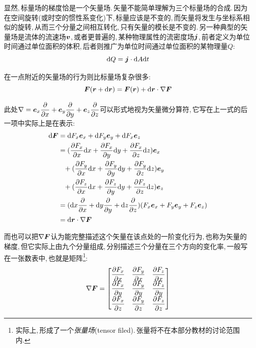 显然,\,标量场的梯度恰是一个矢量场.\,矢量不能简单理解为三个标量场的合成.\,因为在空间旋转(或时空的惯性系变化)下,\,标量应该是不变的,\,而矢量将发生与坐标系相似的旋转,\,从而三个分量之间相互转化,\,只有矢量的模长是不变的.\,另一种典型的矢量场是流体的流速场\(\boldsymbol{v}\),\,或者更普遍的,\,某种物理属性的流密度场\(\boldsymbol{j}\),\,前者定义为单位时间通过单位面积的体积,\,后者则推广为单位时间通过单位面积的某物理量\(Q\):
\[\textrm{d} Q=\boldsymbol{j}\cdot\textrm{d} A\textrm{d} t\]

在一点附近的矢量场的行为则比标量场复杂很多:
\[\boldsymbol{F}(\boldsymbol{r}+\textrm{d}\boldsymbol{r})=\boldsymbol{F}(\boldsymbol{r})+\textrm{d} \boldsymbol{r}\cdot\nabla \boldsymbol{F}\]

此处\(\nabla=\boldsymbol{e}_x\dfrac{\partial}{\partial x}+\boldsymbol{e}_y\dfrac{\partial}{\partial y}+\boldsymbol{e}_z\dfrac{\partial}{\partial z}\)可以形式地视为矢量微分算符,\,它写在上一式的后一项中实际上是在表示:
\begin{align*}
\textrm{d} \boldsymbol{F} 	&=\textrm{d} F_x \boldsymbol{e}_x+\textrm{d} F_y \boldsymbol{e}_y+\textrm{d} F_x \boldsymbol{e}_z \\
			&=(\frac{\partial F_x}{\partial x}\textrm{d} x+\frac{\partial F_x}{\partial y}\textrm{d} y+\frac{\partial F_x}{\partial z}\textrm{d} z)\boldsymbol{e}_x\\
			&\phantom{=}+(\frac{\partial F_y}{\partial x}\textrm{d} x+\frac{\partial F_y}{\partial y}\textrm{d} y+\frac{\partial F_y}{\partial z}\textrm{d} z)\boldsymbol{e}_y\\
			&\phantom{=}+(\frac{\partial F_z}{\partial x}\textrm{d} x+\frac{\partial F_z}{\partial y}\textrm{d} y+\frac{\partial F_z}{\partial z}\textrm{d} z)\boldsymbol{e}_z\\
			&=(\textrm{d} x\frac{\partial}{\partial x}+\textrm{d} y\frac{\partial}{\partial y}+\textrm{d} z\frac{\partial}{\partial z})(F_x\boldsymbol{e}_x+F_y\boldsymbol{e}_y+F_z\boldsymbol{e}_z)\\
			&=\textrm{d} \boldsymbol{r}\cdot\nabla \boldsymbol{F}
\end{align*}

而也可以把\(\nabla \boldsymbol{F}\)认为能完整描述这个矢量在该点处的一阶变化行为,\,也称为矢量的梯度,\,但它实际上由九个分量组成,\,分别描述三个分量在三个方向的变化率,\,一般写在一张数表中,\,也就是矩阵\footnote{实际上,\,形成了一个\emph{张量场}(tensor filed).\,张量将不在本部分教材的讨论范围内.}:
\[\nabla \boldsymbol{F}=\begin{bmatrix}
\dfrac{\partial F_x}{\partial x}&\dfrac{\partial F_y}{\partial x}&\dfrac{\partial F_z}{\partial x}\\[3pt]
\dfrac{\partial F_x}{\partial y}&\dfrac{\partial F_y}{\partial y}&\dfrac{\partial F_z}{\partial y}\\[3pt]
\dfrac{\partial F_x}{\partial z}&\dfrac{\partial F_y}{\partial z}&\dfrac{\partial F_z}{\partial z}
\end{bmatrix}\]

